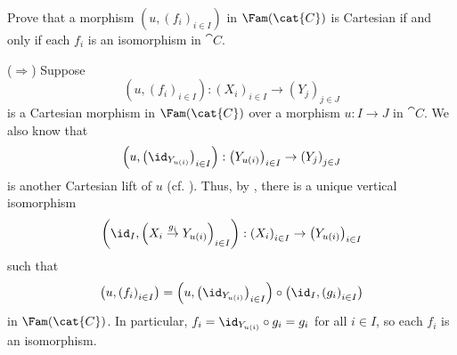 \begin{exercise}
Prove that a morphism \(\left(u,\left(f_i\right)_{i \in I}\right)\) in \(\Fam(\cat{C})\) is Cartesian if and only if each \(f_i\) is an isomorphism in \(\cat{C}\).
\end{exercise}

\begin{solution}
(\(\Longrightarrow\))
Suppose
\begin{equation*}
\left(u,\left(f_i\right)_{i \in I}\right) : \left(X_i\right)_{i \in I} \to \left(Y_j\right)_{j \in J}
\end{equation*}
is a Cartesian morphism in \(\Fam(\cat{C})\) over a morphism \(u : I \to J\) in \(\cat{C}\).
We also know that
\begin{equation*}
\left(u, \left(\id_{Y_{u(i)}}\right)_{i \in I}\right) : \left(Y_{u(i)}\right)_{i \in I} \to \left(Y_j\right)_{j \in J}
\end{equation*}
is another Cartesian lift of \(u\) (cf. \cite[preceding Definition~1.2.1]{MR1674451}).
Thus, by , there is a unique vertical isomorphism
\begin{equation*}
\left(\id_I, \left(X_i \overset{g_i}{\to} Y_{u(i)}\right)_{i \in I}\right) : \left(X_i\right)_{i \in I} \to \left(Y_{u(i)}\right)_{i \in I}
\end{equation*}
such that
\begin{equation*}
\left(u,\left(f_i\right)_{i \in I}\right)
= \left(u, \left(\id_{Y_{u(i)}}\right)_{i \in I}\right) \circ \left(\id_I, \left(g_i\right)_{i \in I}\right)
\end{equation*}
in \(\Fam(\cat{C})\).
In particular, \(f_i = \id_{Y_{u(i)}} \circ g_i = g_i\) for all \(i \in I\), so each \(f_i\) is an isomorphism.


\end{solution}
